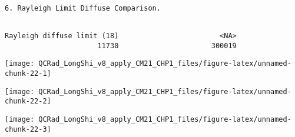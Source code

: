 \documentclass[
  10pt,
  a4paper,oneside]{article}
\newenvironment{Shaded}{\begin{snugshade}}{\end{snugshade}}
\newcommand{\AttributeTok}[1]{\textcolor[rgb]{0.77,0.63,0.00}{#1}}
\newcommand{\ConstantTok}[1]{\textcolor[rgb]{0.00,0.00,0.00}{#1}}
\newcommand{\DocumentationTok}[1]{\textcolor[rgb]{0.56,0.35,0.01}{\textbf{\textit{#1}}}}
\newcommand{\ErrorTok}[1]{\textcolor[rgb]{0.64,0.00,0.00}{\textbf{#1}}}
\newcommand{\FunctionTok}[1]{\textcolor[rgb]{0.00,0.00,0.00}{#1}}
\newcommand{\NormalTok}[1]{#1}
\newcommand{\SpecialCharTok}[1]{\textcolor[rgb]{0.00,0.00,0.00}{#1}}
\newcommand{\StringTok}[1]{\textcolor[rgb]{0.31,0.60,0.02}{#1}}
\begin{document}
\begin{Shaded}
\end{Shaded}

\begin{verbatim}

6. Rayleigh Limit Diffuse Comparison.
\end{verbatim}

\begin{verbatim}

Rayleigh diffuse limit (18)                        <NA> 
                      11730                      300019 
\end{verbatim}

\begin{center}\texttt{[image: QCRad\_LongShi\_v8\_apply\_CM21\_CHP1\_files/figure-latex/unnamed-chunk-22-1]} \end{center}

\begin{center}\texttt{[image: QCRad\_LongShi\_v8\_apply\_CM21\_CHP1\_files/figure-latex/unnamed-chunk-22-2]} \end{center}

\begin{center}\texttt{[image: QCRad\_LongShi\_v8\_apply\_CM21\_CHP1\_files/figure-latex/unnamed-chunk-22-3]} \end{center}
\end{document}
